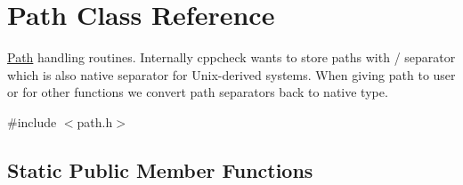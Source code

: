 \hypertarget{class_path}{\section{Path Class Reference}
\label{class_path}
}


\hyperlink{class_path}{Path} handling routines. Internally cppcheck wants to store paths with / separator which is also native separator for Unix-\/derived systems. When giving path to user or for other functions we convert path separators back to native type.  




{\ttfamily \#include $<$path.\-h$>$}

\subsection*{Static Public Member Functions}
